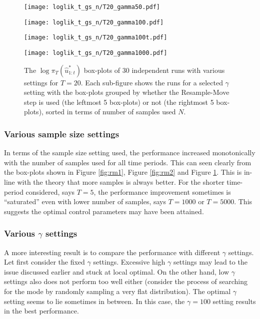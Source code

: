 \begin{figure}[!thbp]
    \centering
    \begin{minipage}{0.5\textwidth}
        \centering
        \texttt{[image: loglik\_t\_gs\_n/T20\_gamma50.pdf]}
    \end{minipage}%
    \begin{minipage}{0.5\textwidth}
        \centering
        \texttt{[image: loglik\_t\_gs\_n/T20\_gamma100.pdf]}
    \end{minipage}
    \begin{minipage}{0.5\textwidth}
        \centering
        \texttt{[image: loglik\_t\_gs\_n/T20\_gamma100t.pdf]}
    \end{minipage}%
    \begin{minipage}{0.5\textwidth}
        \centering
        \texttt{[image: loglik\_t\_gs\_n/T20\_gamma1000.pdf]}
    \end{minipage}
    \caption{The $\log\pi_T(\hat{u}^*_{1:t})$ box-plots of 30 independent runs with various settings for $T=20$. Each sub-figure shows the runs for a selected $\gamma$ setting with the box-plots grouped by whether the Resample-Move step is used (the leftmost 5 box-plots) or not (the rightmost 5 box-plots), sorted in terms of number of samples used $N$.}
    \label{fig:rm3}
\end{figure}

\subsubsection{Various sample size settings}
In terms of the sample size setting used, the performance increased monotonically with the number of samples used for all time periods. This can seen clearly from the box-plots shown in Figure \ref{fig:rm1}, Figure \ref{fig:rm2} and Figure \ref{fig:rm3}. This is in-line with the theory that more samples is always better. For the shorter time-period considered, says $T=5$, the performance improvement sometimes is ``saturated'' even with lower number of samples, says $T=1000$ or $T=5000$. This suggests the optimal control parameters may have been attained.

 \subsubsection{Various $\gamma$ settings}
A more interesting result is to compare the performance with different $\gamma$ settings. Let first consider the fixed $\gamma$ settings. Excessive high $\gamma$ settings may lead to the issue discussed earlier and stuck at local optimal. On the other hand, low $\gamma$ settings also does not perform too well either (consider the process of searching for the mode by randomly sampling a very flat distribution). The optimal $\gamma$ setting seems to lie sometimes in between. In this case, the $\gamma=100$ setting results in the best performance.

